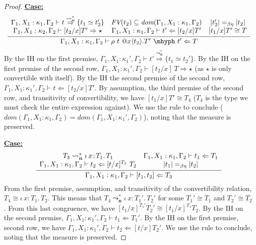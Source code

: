 \documentclass{article}
\newcommand{\abs}[4]{{#1}\, #2\! : \! #3.\, #4}
\newcommand{\leadstocs}[0]{\ensuremath{\leadsto_{\mathbf{n}}^*}}
\newcommand{\tpcheck}[0]{\Leftarrow}
\newcommand{\tpsynth}[0]{\Rightarrow}
\newcommand{\tpsynthleads}[0]{\ensuremath{\overset{\leadstocs}{\Rightarrow}}}
\newcommand{\startcase}[1]{\vspace{#1} \noindent\textbf{\underline{Case:}}}
\begin{document}
\begin{proof}
  \startcase{.2cm}
  \[
    \infer{\Gamma_1,X_1:\kappa_1,\Gamma_2 \vdash \rho\ t\ @x\langle t_2 \rangle.T'\ \mhyph\ t' \tpcheck T}
    {
      \begin{array}{ccc}
        \Gamma_1,X_1:\kappa_1,\Gamma_2 \vdash t \tpsynthleads \{t_1 \simeq t_2'\}
        & \textit{FV}(t_2) \subseteq \textit{dom}(\Gamma_1,X_1:\kappa_1,\Gamma_2)
        & |t_2'| =_{\beta\eta} |t_2|
        \\ \Gamma_1,X_1:\kappa_2,\Gamma_2 \vdash [t_2/x] T' \tpsynth \star
        & \Gamma_1,X_1:\kappa_1,\Gamma_2 \vdash t' \tpcheck [t_2/x]T'
        & [t_1/x]T' \cong T
      \end{array}
    }
  \]
  By the IH on the first premise, \(\Gamma_1,X_1:\kappa_1',\Gamma_2 \vdash t'
  \tpsynthleads \{t_1 \simeq t_2'\}\).
  By the IH on the first premise of the second row,
  \(\Gamma_1,X_1:\kappa_1',\Gamma_2 \vdash [t_2/x]\ T \tpsynth \star\)
  (as \(\star\) is only convertible with itself).
  By the IH the second premise of the second row,
  \(\Gamma_1,X_1:\kappa_1',\Gamma_2 \vdash t \tpcheck [t_2/x]T'\).
  By assumption, the third premise of the second row, and transitivity of
  convertibility, we have \([t_1/x]T' \cong T_4\) (\(T_4\) is the type we must
  check the entire expression against).
  We use the rule to conclude (\(\textit{dom}(\Gamma_1,X_1:\kappa_1,\Gamma_2) =
  \textit{dom}(\Gamma_1,X_1:\kappa_1',\Gamma_2)\)), noting that the measure is
  preserved.
  
  \startcase{.2cm}
  \[
    \infer{
      \Gamma_1,X_1:\kappa_1,\Gamma_2 \vdash [ t_1 , t_2 ] \tpcheck T_3
    }{
      \begin{array}{cc}
        T_3 \leadstocs \abs{\iota}{x}{T_1}{T_1}
        & \Gamma_1,X_1:\kappa_1,\Gamma_2 \vdash t_1 \tpcheck T_1
        \\ \Gamma_1,X_1:\kappa_1,\Gamma_2 \vdash t_2 \tpcheck [t/x]^{T_1}\ T_2
        & |t_1| =_{\beta\eta} |t_2|
      \end{array}
    }
  \]
  From the first premise, assumption, and transitivity of the convertibility
  relation, \(T_4 \cong \abs{\iota}{x}{T_1}{T_2}\).
  This means that \(T_4 \leadstocs \abs{\iota}{x}{T_1'}{T_2'}\) for some
  \(T_1' \cong T_1\) and \(T_2' \cong T_2\).
  From this last congruence, we have \([t_1/x]^{T_1'}T_2' \cong [t_1/x]^{T_1} T_2\).
  By the IH on the second premise, \(\Gamma_1,X_1:\kappa_1',\Gamma_2 \vdash t_1
  \tpcheck T_1'\).
  By the IH on the first premise, second row, we have
  \(\Gamma_1,X_1:\kappa_1',\Gamma_2 \vdash t_2 \tpcheck [t/x]T_2'\).
  We use the rule to conclude, noting that the measure is preserved.
  

\end{proof}
\end{document}
